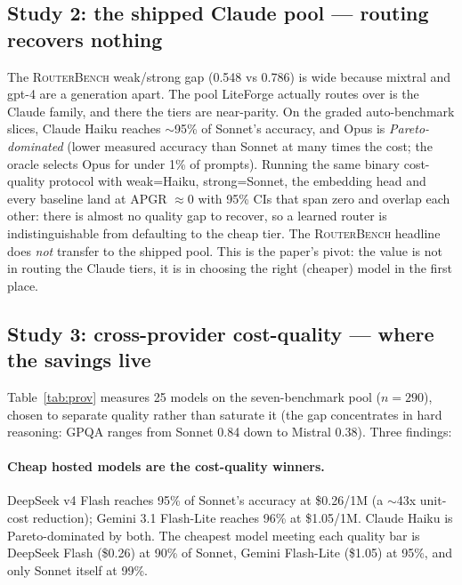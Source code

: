 \documentclass[11pt]{article}
\newcommand{\rb}{\textsc{RouterBench}}
\newcommand{\NPROV}{25}            %
\newcommand{\NPROMPTS}{290}        %
\begin{document}
\subsection{Study 2: the shipped Claude pool --- routing recovers nothing}
The \rb{} weak/strong gap (0.548 vs 0.786) is wide because mixtral and gpt-4 are a
generation apart. The pool LiteForge actually routes over is the Claude family, and there
the tiers are near-parity. On the graded auto-benchmark slices, Claude Haiku reaches
$\sim$95\% of Sonnet's accuracy, and Opus is \emph{Pareto-dominated} (lower measured
accuracy than Sonnet at many times the cost; the oracle selects Opus for under 1\% of
prompts). Running the same binary cost-quality protocol with weak=Haiku, strong=Sonnet,
the embedding head and every baseline land at APGR $\approx 0$ with 95\% CIs that span
zero and overlap each other: there is almost no quality gap to recover, so a learned
router is indistinguishable from defaulting to the cheap tier. The \rb{} headline does
\emph{not} transfer to the shipped pool. This is the paper's pivot: the value is not in
routing the Claude tiers, it is in choosing the right (cheaper) model in the first place.

\subsection{Study 3: cross-provider cost-quality --- where the savings live}
Table~\ref{tab:prov} measures \NPROV{} models on the seven-benchmark pool ($n{=}\NPROMPTS$),
chosen to separate quality rather than saturate it (the gap concentrates in hard
reasoning: GPQA ranges from Sonnet 0.84 down to Mistral 0.38). Three findings:

\paragraph{Cheap hosted models are the cost-quality winners.} DeepSeek v4 Flash reaches
95\% of Sonnet's accuracy at \$0.26/1M (a $\sim$43x unit-cost reduction); Gemini 3.1
Flash-Lite reaches 96\% at \$1.05/1M. Claude Haiku is Pareto-dominated by both. The
cheapest model meeting each quality bar is DeepSeek Flash (\$0.26) at 90\% of Sonnet,
Gemini Flash-Lite (\$1.05) at 95\%, and only Sonnet itself at 99\%.
\end{document}
